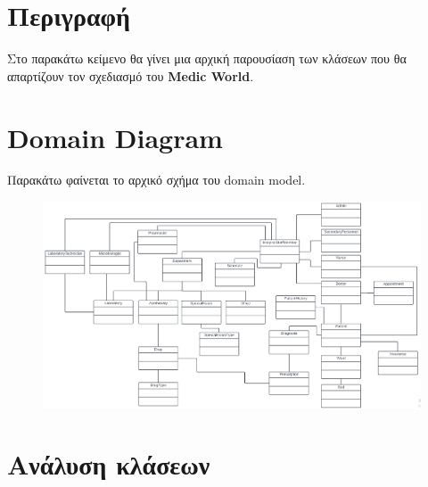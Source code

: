 \documentclass{article}
\begin{document}
\section{Περιγραφή}
Στο παρακάτω κείμενο θα γίνει μια αρχική παρουσίαση των κλάσεων που θα απαρτίζουν τον σχεδιασμό του \textbf{Medic World}. 

\vspace{1cm}

\section{Domain Diagram}
Παρακάτω φαίνεται το αρχικό σχήμα του domain model.

\begin{figure}[!htb]
        \centering
        \includegraphics[width=1.0\textwidth]{domain.png}
        \end{figure}

\section{Ανάλυση κλάσεων}
\end{document}
